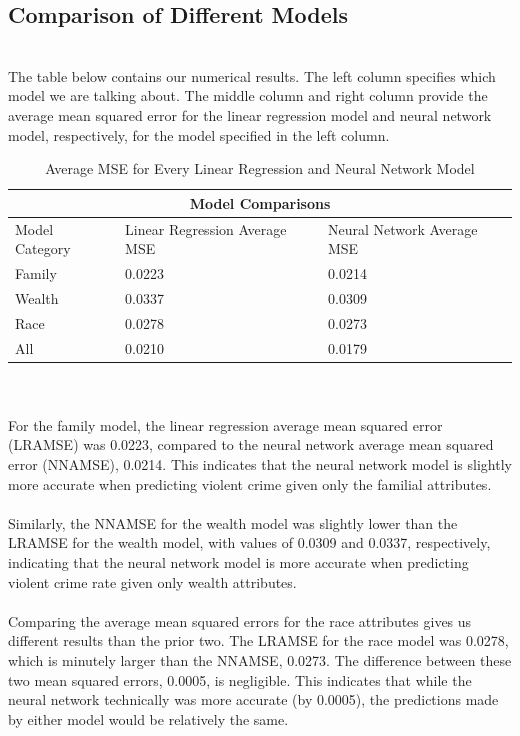 \documentclass[letterpaper, 11 pt, conference]{article}
\begin{document}
\subsection{Comparison of Different Models}
\\The table below contains our numerical results. The left column specifies which model we are talking about. The middle column and right column provide the average mean squared error for the linear regression model and neural network model, respectively, for the model specified in the left column.
\begin{table}[H]
    \centering
    \begin{tabular}{ |p{3cm}||p{6cm}|p{5.5cm}|  }
     \hline
     \multicolumn{3}{|c|}{Model Comparisons} \\
     \hline
     Model Category & Linear Regression Average MSE & Neural Network Average MSE\\
     \hline
     Family & 0.0223 & 0.0214\\
     Wealth & 0.0337 & 0.0309\\
     Race & 0.0278 & 0.0273\\
     All & 0.0210 & 0.0179\\
     \hline
\end{tabular}
\caption{\label{tab:widgets}Average MSE for Every Linear Regression and Neural Network Model}
\end{table}
\\
\\For the family model, the linear regression average mean squared error (LRAMSE) was 0.0223, compared to the neural network average mean squared error (NNAMSE), 0.0214. This indicates that the neural network model is slightly more accurate when predicting violent crime given only the familial attributes.
\\
\\Similarly, the NNAMSE for the wealth model was slightly lower than the LRAMSE for the wealth model, with values of 0.0309 and 0.0337, respectively, indicating that the neural network model is more accurate when predicting violent crime rate given only wealth attributes.
\\
\\Comparing the average mean squared errors for the race attributes gives us different results than the prior two. The LRAMSE for the race model was 0.0278, which is minutely larger than the NNAMSE, 0.0273. The difference between these two mean squared errors, 0.0005, is negligible. This indicates that while the neural network technically was more accurate (by 0.0005), the predictions made by either model would be relatively the same.
\end{document}
